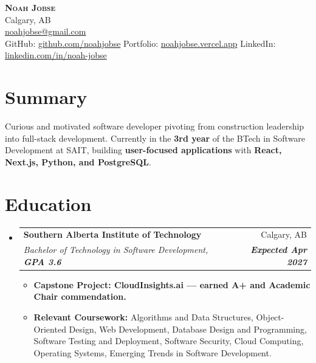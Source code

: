 \documentclass[letterpaper,11pt]{article}
\makeatletter
\newcommand{\resumeItem}[1]{\item\small{#1}}
\newcommand{\resumeSubheading}[4]{
  \vspace{-2pt}\item
  \begin{tabular*}{0.97\textwidth}[t]{l@{\extracolsep{\fill}}r}
    \textbf{#1} & #2 \\
    \textit{\small#3} & \textit{\small #4} \\
  \end{tabular*}\vspace{-7pt}
}
\newcommand{\resumeSubHeadingListStart}{\begin{itemize}[leftmargin=0.15in, label={}]}
\newcommand{\resumeSubHeadingListEnd}{\end{itemize}}
\newcommand{\resumeItemListStart}{\begin{itemize}[leftmargin=0.3in]}
\newcommand{\resumeItemListEnd}{\end{itemize}}
\makeatother
\begin{document}
\begin{center}
  \textbf{\Huge \scshape Noah Jobse} \\ \vspace{1pt}
  Calgary, AB \\ 
  \small \href{mailto:noahjobse@gmail.com}{noahjobse@gmail.com} \\ 
  GitHub: \href{https://github.com/noahjobse}{github.com/noahjobse} \quad
  Portfolio: \href{https://noahjobse.vercel.app}{noahjobse.vercel.app} \quad
  LinkedIn: \href{https://linkedin.com/in/noah-jobse}{linkedin.com/in/noah-jobse}
\end{center}

\section{Summary}
\small
Curious and motivated software developer pivoting from construction leadership into full-stack development. Currently in the \textbf{3rd year} of the BTech in Software Development at SAIT, building \textbf{user-focused applications} with \textbf{React, Next.js, Python, and PostgreSQL}.

\section{Education}
\resumeSubHeadingListStart
  \resumeSubheading
    {Southern Alberta Institute of Technology}{Calgary, AB}
    {Bachelor of Technology in Software Development, \textbf{GPA 3.6}}{\textbf{Expected Apr 2027}}
      \resumeItemListStart
        \resumeItem{\textbf{Capstone Project: CloudInsights.ai — earned A+ and Academic Chair commendation.}}
        \resumeItem{\textbf{Relevant Coursework:} Algorithms and Data Structures, Object-Oriented Design, Web Development, Database Design and Programming, Software Testing and Deployment, Software Security, Cloud Computing, Operating Systems, Emerging Trends in Software Development.}
      \resumeItemListEnd
\resumeSubHeadingListEnd

\end{document}

